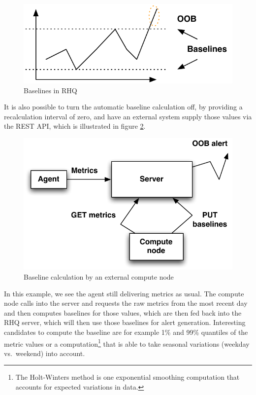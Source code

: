 \documentclass[twocolumn,10pt,a4paper]{article}
\begin{document}
\begin{figure}[h]
\noindent\includegraphics[width=\columnwidth]{graph/baseline_graph.pdf}
\caption{Baselines in RHQ}
\label{fig:baseline}
\end{figure}

It is also possible to turn the automatic baseline calculation off, by providing a recalculation interval of zero, and have an external system supply those values via the REST API, which is illustrated in figure \ref{fig:comp-node}.

\begin{figure}[h]
\noindent\includegraphics[width=\columnwidth]{graph/ext_baseline.pdf}
\caption{Baseline calculation by an external compute node}
\label{fig:comp-node}
\end{figure}

In this example, we see the agent still delivering metrics as usual. The compute node calls into the server and requests the raw metrics from the most recent day and then computes baselines for those values, which are then fed back into the RHQ server, which will then use those baselines for alert generation. Interesting candidates to compute the baseline are for example 1\% and 99\% quantiles of the metric values or a computation\footnote{The Holt-Winters method is one exponential smoothing computation that accounts for expected variations in data.} that is able to take seasonal variations (weekday vs.\ weekend) into account.
\end{document}
